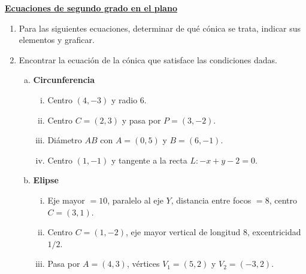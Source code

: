 \documentclass[11pt]{article}
\begin{document}
\underline{\bf \large{Ecuaciones de segundo grado en el plano}}
\begin{enumerate}[\hspace{-5mm}$1)$]
\item Para las siguientes ecuaciones, determinar de qué cónica se trata, indicar sus elementos y graficar. 










\item Encontrar la ecuación de la cónica que satisface las condiciones dadas.
\begin{enumerate}[a)]
\item \textbf{Circunferencia}
\begin{enumerate}[i.]
\item Centro $(4, -3)$ y radio 6.
\item Centro $C = (2, 3)$ y pasa por $P = (3, -2)$.
\item Diámetro $AB$ con $A = (0, 5)$ y $B = (6, -1)$.
\item Centro $(1, -1)$ y tangente a la recta $L: -x + y - 2 = 0$.
\end{enumerate}

\item \textbf{Elipse}
\begin{enumerate}[i.]
\item Eje mayor $= 10$, paralelo al eje $Y$, distancia entre focos $= 8$, centro $C = (3, 1)$.
\item Centro $C = (1, -2)$, eje mayor vertical de longitud 8, excentricidad $1/2$.
\item Pasa por $A = (4, 3)$, vértices $V_1 = (5, 2)$ y $V_2 = (-3, 2)$.
\end{enumerate}


\end{enumerate}
\end{enumerate}
\end{document}
